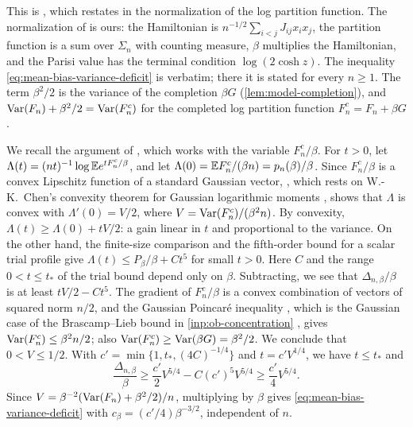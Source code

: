 This is \cite[Remark~7.14, (7.68)]{quantitative-parisi}, which restates \cite[Lemma~7.4]{quantitative-parisi} in the normalization of the log partition function. The normalization of \cite[(1.1)]{quantitative-parisi} is ours: the Hamiltonian is $n^{-1/2}\sum_{i<j}J_{ij}x_ix_j$, the partition function is a sum over $\Sigma_n$ with counting measure, $\beta$ multiplies the Hamiltonian, and the Parisi value has the terminal condition $\log(2\cosh z)$. The inequality \eqref{eq:mean-bias-variance-deficit} is \cite[(7.68)]{quantitative-parisi} verbatim; there it is stated for every $n\ge1$. The term $\beta^2/2$ is the variance of the completion $\beta G$ (\cref{lem:model-completion}), and $\operatorname{Var}(F_n)+\beta^2/2=\operatorname{Var}(F_n^c)$ for the completed log partition function $F_n^c=F_n+\beta G$.

We recall the argument of \cite[Lemma~7.4]{quantitative-parisi}, which works with the variable $F_n^c/\beta$. For $t>0$, let $\Lambda(t)=(nt)^{-1}\log\mathbb E e^{tF_n^c/\beta}$, and let $\Lambda(0)=\mathbb E F_n^c/(\beta n)=p_n(\beta)/\beta$. Since $F_n^c/\beta$ is a convex Lipschitz function of a standard Gaussian vector, \cite[Lemma~5.2]{quantitative-parisi}, which rests on W.-K.~Chen's convexity theorem for Gaussian logarithmic moments \cite[Theorem~1]{chen-gaussian-convexity}, shows that $\Lambda$ is convex with $\Lambda'(0)=V/2$, where $V=\operatorname{Var}(F_n^c)/(\beta^2n)$. By convexity, $\Lambda(t)\ge\Lambda(0)+tV/2$: a gain linear in $t$ and proportional to the variance. On the other hand, the finite-size comparison \cite[(7.1)]{quantitative-parisi} and the fifth-order bound for a scalar trial profile \cite[Lemma~7.2, (7.3)]{quantitative-parisi} give $\Lambda(t)\le P_\beta/\beta+Ct^5$ for small $t>0$. Here $C$ and the range $0<t\le t_*$ of the trial bound depend only on $\beta$. Subtracting, we see that $\Delta_{n,\beta}/\beta$ is at least $tV/2-Ct^5$. The gradient of $F_n^c/\beta$ is a convex combination of vectors of squared norm $n/2$, and the Gaussian Poincar\'e inequality \cite[Theorem~3.20]{boucheron-lugosi-massart-2013}, which is the Gaussian case of the Brascamp--Lieb bound in \cref{inp:ob-concentration} \cite{brascamp-lieb-1976}, gives $\operatorname{Var}(F_n^c)\le\beta^2n/2$; also $\operatorname{Var}(F_n^c)\ge\operatorname{Var}(\beta G)=\beta^2/2$. We conclude that $0<V\le1/2$. With $c'=\min\{1,t_*,(4C)^{-1/4}\}$ and $t=c'V^{1/4}$, we have $t\le t_*$ and
\[
 \frac{\Delta_{n,\beta}}{\beta}\ge\frac{c'}{2}V^{5/4}-C(c')^5V^{5/4}\ge\frac{c'}{4}V^{5/4}.
\]
Since $V=\beta^{-2}(\operatorname{Var}(F_n)+\beta^2/2)/n$, multiplying by $\beta$ gives \eqref{eq:mean-bias-variance-deficit} with $c_\beta=(c'/4)\beta^{-3/2}$, independent of $n$.


